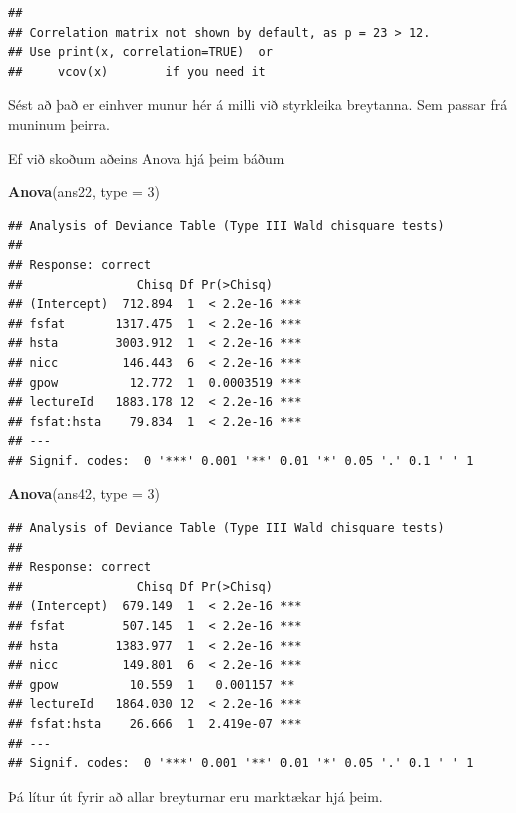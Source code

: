 \documentclass[
]{article}
\newenvironment{Shaded}{\begin{snugshade}}{\end{snugshade}}
\newcommand{\DataTypeTok}[1]{\textcolor[rgb]{0.13,0.29,0.53}{#1}}
\newcommand{\DecValTok}[1]{\textcolor[rgb]{0.00,0.00,0.81}{#1}}
\newcommand{\KeywordTok}[1]{\textcolor[rgb]{0.13,0.29,0.53}{\textbf{#1}}}
\newcommand{\NormalTok}[1]{#1}
\begin{document}
\begin{verbatim}
## 
## Correlation matrix not shown by default, as p = 23 > 12.
## Use print(x, correlation=TRUE)  or
##     vcov(x)        if you need it
\end{verbatim}

Sést að það er einhver munur hér á milli við styrkleika breytanna. Sem passar frá muninum þeirra.

Ef við skoðum aðeins Anova hjá þeim báðum

\begin{Shaded}
\begin{Highlighting}[]
\KeywordTok{Anova}\NormalTok{(ans22, }\DataTypeTok{type =} \DecValTok{3}\NormalTok{)}
\end{Highlighting}
\end{Shaded}

\begin{verbatim}
## Analysis of Deviance Table (Type III Wald chisquare tests)
## 
## Response: correct
##                Chisq Df Pr(>Chisq)    
## (Intercept)  712.894  1  < 2.2e-16 ***
## fsfat       1317.475  1  < 2.2e-16 ***
## hsta        3003.912  1  < 2.2e-16 ***
## nicc         146.443  6  < 2.2e-16 ***
## gpow          12.772  1  0.0003519 ***
## lectureId   1883.178 12  < 2.2e-16 ***
## fsfat:hsta    79.834  1  < 2.2e-16 ***
## ---
## Signif. codes:  0 '***' 0.001 '**' 0.01 '*' 0.05 '.' 0.1 ' ' 1
\end{verbatim}

\begin{Shaded}
\begin{Highlighting}[]
\KeywordTok{Anova}\NormalTok{(ans42, }\DataTypeTok{type =} \DecValTok{3}\NormalTok{)}
\end{Highlighting}
\end{Shaded}

\begin{verbatim}
## Analysis of Deviance Table (Type III Wald chisquare tests)
## 
## Response: correct
##                Chisq Df Pr(>Chisq)    
## (Intercept)  679.149  1  < 2.2e-16 ***
## fsfat        507.145  1  < 2.2e-16 ***
## hsta        1383.977  1  < 2.2e-16 ***
## nicc         149.801  6  < 2.2e-16 ***
## gpow          10.559  1   0.001157 ** 
## lectureId   1864.030 12  < 2.2e-16 ***
## fsfat:hsta    26.666  1  2.419e-07 ***
## ---
## Signif. codes:  0 '***' 0.001 '**' 0.01 '*' 0.05 '.' 0.1 ' ' 1
\end{verbatim}

Þá lítur út fyrir að allar breyturnar eru marktækar hjá þeim.
\end{document}
